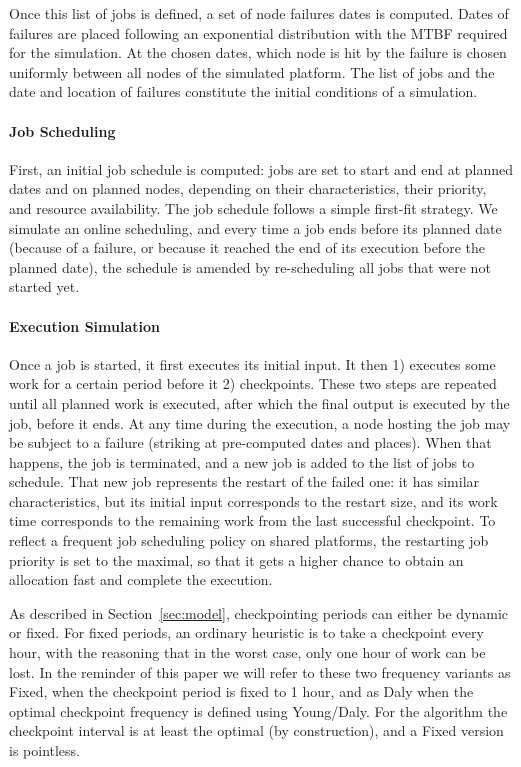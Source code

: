 Once this list of jobs is defined, a set of node failures dates is
computed. Dates of failures are placed following an exponential
distribution with the MTBF required for the simulation. At the chosen
dates, which node is hit by the failure is chosen uniformly between
all nodes of the simulated platform. The list of jobs and the date and
location of failures constitute the initial conditions of a
simulation.

\paragraph*{Job Scheduling}
First, an initial job schedule is computed: jobs are set to start and
end at planned dates and on planned nodes, depending on their
characteristics, their priority, and resource availability. The job
schedule follows a simple first-fit strategy. We simulate an online
scheduling, and every time a job ends before its planned date
(because of a failure, or because it reached the end of its execution
before the planned date), the schedule is amended by re-scheduling all
jobs that were not started yet.

\paragraph*{Execution Simulation}
Once a job is started, it first executes its initial input. It then 1)
executes some work for a certain period before it 2) checkpoints. These two
steps are repeated until all planned work is executed, after which the
final output is executed by the job, before it ends. At any time
during the execution, a node hosting the job may be subject to a
failure (striking at pre-computed dates and places). When that
happens, the job is terminated, and a new job is added to the list of
jobs to schedule. That new job represents the restart of the failed
one: it has similar characteristics, but its initial input
corresponds to the restart size, and its work time corresponds to
the remaining work from the last successful checkpoint. To reflect a
frequent job scheduling policy on shared platforms, the restarting job
priority is set to the maximal, so that it gets a higher chance to
obtain an allocation fast and complete the execution.

As described in Section~\ref{sec:model}, checkpointing periods can
either be dynamic or fixed. For fixed periods, an ordinary heuristic
is to take a checkpoint every hour, with the reasoning that in the
worst case, only one hour of work can be lost. In the reminder of
this paper we will refer to these two frequency variants as Fixed,
when the checkpoint period is fixed to 1 hour, and as Daly when the
optimal checkpoint frequency is defined using Young/Daly. For the
\leastwaste algorithm the checkpoint interval is at least the optimal
(by construction), and a Fixed version is pointless.


